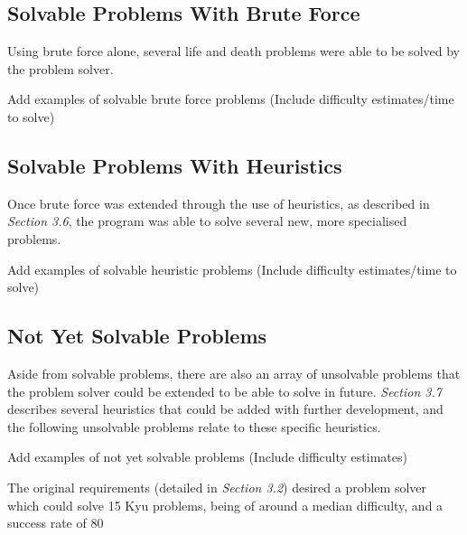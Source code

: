 \documentclass{l3proj}
\begin{document}
\subsection{Solvable Problems With Brute Force}

Using brute force alone, several life and death problems were able to be solved by the problem solver.

Add examples of solvable brute force problems (Include difficulty estimates/time to solve)

\subsection{Solvable Problems With Heuristics}

Once brute force was extended through the use of heuristics, as described in \textit{Section 3.6}, the program was able to solve several new, more specialised problems.

Add examples of solvable heuristic problems (Include difficulty estimates/time to solve)

\subsection{Not Yet Solvable Problems}

Aside from solvable problems, there are also an array of unsolvable problems that the problem solver could be extended to be able to solve in future. \textit{Section 3.7} describes several heuristics that could be added with further development, and the following unsolvable problems relate to these specific heuristics.

Add examples of not yet solvable problems (Include difficulty estimates)

The original requirements (detailed in \textit{Section 3.2}) desired a problem solver which could solve 15 Kyu problems, being of around a median difficulty, and a success rate of 80%
\end{document}
